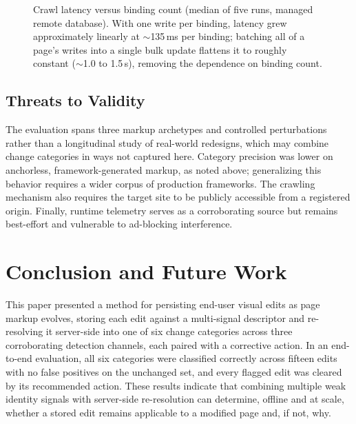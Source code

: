 \documentclass[conference]{IEEEtran}
\begin{document}
\begin{figure}[t]
\centering
{}
\caption{Crawl latency versus binding count (median of five runs, managed remote database). With one write per binding, latency grew approximately linearly at $\sim$135\,ms per binding; batching all of a page's writes into a single bulk update flattens it to roughly constant ($\sim$1.0 to 1.5\,s), removing the dependence on binding count.}
\label{tab:latency}
\end{figure}

\subsection{Threats to Validity}
The evaluation spans three markup archetypes and controlled perturbations rather than a longitudinal study of real-world redesigns, which may combine change categories in ways not captured here. Category precision was lower on anchorless, framework-generated markup, as noted above; generalizing this behavior requires a wider corpus of production frameworks. The crawling mechanism also requires the target site to be publicly accessible from a registered origin. Finally, runtime telemetry serves as a corroborating source but remains best-effort and vulnerable to ad-blocking interference.

\section{Conclusion and Future Work}\label{sec:conc}
This paper presented a method for persisting end-user visual edits as page markup evolves, storing each edit against a multi-signal descriptor and re-resolving it server-side into one of six change categories across three corroborating detection channels, each paired with a corrective action. In an end-to-end evaluation, all six categories were classified correctly across fifteen edits with no false positives on the unchanged set, and every flagged edit was cleared by its recommended action. These results indicate that combining multiple weak identity signals with server-side re-resolution can determine, offline and at scale, whether a stored edit remains applicable to a modified page and, if not, why.
\end{document}
